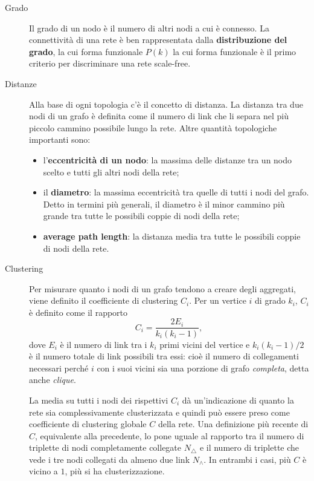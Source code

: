 \begin{description}
	\item[Grado] Il grado di un nodo è il numero di altri nodi a cui è connesso. La connettività di una rete è ben rappresentata dalla \textbf{distribuzione del grado}, la cui forma funzionale $P(k)$ la cui forma funzionale è il primo criterio per discriminare una rete scale-free. 
	
	\item[Distanze] Alla base di ogni topologia c'è il concetto di distanza. La distanza tra due nodi di un grafo è definita come il numero di link che li separa nel più piccolo cammino possibile lungo la rete. Altre quantità topologiche importanti sono: 
	\begin{itemize}
		\item l'\textbf{eccentricità di un nodo}: la massima delle distanze tra un nodo scelto e tutti gli altri nodi della rete;
		\item il \textbf{diametro}: la massima eccentricità tra quelle di tutti i nodi del grafo. Detto in termini più generali, il diametro è il minor cammino più grande tra tutte le possibili coppie di nodi della rete;
		\item \textbf{average path length}: la distanza media tra tutte le possibili coppie di nodi della rete.
	\end{itemize} 
	
	\item[Clustering] Per misurare quanto i nodi di un grafo tendono a creare degli aggregati, viene definito il coefficiente di clustering $C_i$. Per un vertice $i$ di grado $k_i$, $C_i$ è definito come il rapporto
	$$C_i = \frac{2E_i}{k_i(k_i-1)},$$
	dove $E_i$ è il numero di link tra i $k_i$ primi vicini del vertice e $k_i(k_i-1)/2$ è il numero totale di link possibili tra essi: cioè il numero di collegamenti necessari perché $i$ con i suoi vicini sia una porzione di grafo \emph{completa}, detta anche \emph{clique}.
	
	La media su tutti i nodi dei rispettivi $C_i$ dà un'indicazione di quanto la rete sia complessivamente clusterizzata e quindi può essere preso come coefficiente di clustering globale $C$ della rete. Una definizione più recente di $C$, equivalente alla precedente, lo pone uguale al rapporto tra il numero di triplette di nodi completamente collegate $N_\triangle$ e il numero di triplette che vede i tre nodi collegati da almeno due link $N_\wedge$. In entrambi i casi, più $C$ è vicino a $1$, più si ha clusterizzazione.


\end{description}
